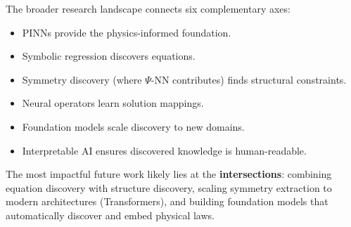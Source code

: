 \documentclass[11pt,a4paper]{article}
\begin{document}
The broader research landscape connects six complementary axes:
\begin{itemize}[leftmargin=1.8em,itemsep=1pt]
\item PINNs provide the physics-informed foundation.
\item Symbolic regression discovers equations.
\item Symmetry discovery (where $\Psi$-NN contributes) finds structural constraints.
\item Neural operators learn solution mappings.
\item Foundation models scale discovery to new domains.
\item Interpretable AI ensures discovered knowledge is human-readable.
\end{itemize}

The most impactful future work likely lies at the \textbf{intersections}: combining equation discovery with structure discovery, scaling symmetry extraction to modern architectures (Transformers), and building foundation models that automatically discover and embed physical laws.
\end{document}
